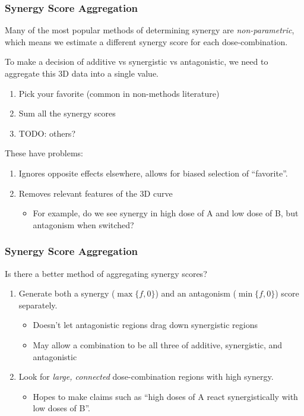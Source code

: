 \documentclass{beamer}
\begin{document}
\begin{frame}
  \frametitle{Synergy Score Aggregation}
  Many of the most popular methods of determining synergy are \textit{non-parametric}, which means we estimate a \alert{different synergy score for each dose-combination}.

  \vfill
  To make a decision of additive vs synergistic vs antagonistic, we need to aggregate this 3D data into a single value.
  \begin{enumerate}
    \item Pick your favorite (common in non-methods literature)
    \item Sum all the synergy scores 
    \item TODO: others?
  \end{enumerate}

  These have problems:
  \begin{enumerate}
    \item Ignores opposite effects elsewhere, allows for biased selection of ``favorite''.
    \item Removes relevant features of the 3D curve\begin{itemize}
	\item For example, do we see synergy in high dose of A and low dose of B, but antagonism when switched?
      \end{itemize}
  \end{enumerate}
\end{frame}

\begin{frame}
  \frametitle{Synergy Score Aggregation}
  \begin{center}
    {\Large{\alert
      {Is there a better method of aggregating synergy scores?}}
    }
  \end{center}
  \vfill
  \begin{enumerate}
    \item Generate both a synergy ($\max\{f, 0\}$) and an antagonism ($\min\{f, 0\}$) score separately. 
      \begin{itemize}
	\item Doesn't let antagonistic regions drag down synergistic regions
	\item May allow a combination to be all three of additive, synergistic, and antagonistic
      \end{itemize}
    \item Look for \textit{large, connected} dose-combination regions with high synergy.
      \begin{itemize}
	\item Hopes to make claims such as ``high doses of A react synergistically with low doses of B''.
      \end{itemize}
  \end{enumerate}
\end{frame}
\end{document}
